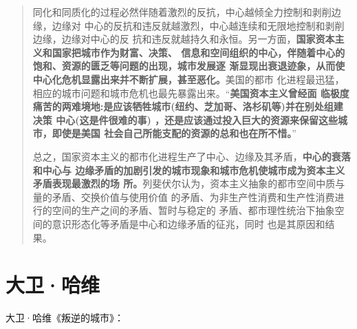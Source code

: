 \begin{quotation}
  同化和同质化的过程必然伴随着激烈的反抗，中心越倾全力控制和剥削边缘，边缘对
  中心的反抗和违反就越激烈，中心越连续和无限地控制和剥削边缘，边缘对中心的反
  抗和违反就越持久和永恒。另一方面，\textbf{国家资本主义和国家把城市作为财富、决策、
  信息和空间组织的中心，伴随着中心的饱和、资源的匮乏等问题的出现，城市发展逐
  渐显现出衰退迹象，从而使中心化危机显露出来并不断扩展，甚至恶化。}美国的都市
  化进程最迅猛，相应的城市问题和城市危机也最先暴露出来。“\textbf{美国资本主义曾经面
  临极度痛苦的两难境地:是应该牺牲城市(纽约、芝加哥、洛杉矶等)并在别处组建决策
  中心(这是件很难的事) ，还是应该通过投入巨大的资源来保留这些城市，即使是美国
  社会自己所能支配的资源的总和也在所不惜。}”

  总之，国家资本主义的都市化进程生产了中心、边缘及其矛盾，\textbf{中心的衰落和中心与
  边缘矛盾的加剧引发的城市现象和城市危机使城市成为资本主义矛盾表现最激烈的场
  所。}列斐伏尔认为，资本主义抽象的都市空间中质与量的矛盾、交换价值与使用价值
  的矛盾、为非生产性消费和生产性消费进行的空间的生产之间的矛盾、暂时与稳定的
  矛盾、都市理性统治下抽象空间的意识形态化等矛盾是中心和边缘矛盾的征兆，同时
  也是其原因和结果。
\end{quotation}

\section{大卫·哈维}

大卫·哈维《叛逆的城市》\cite{harvey2012rebel}：

